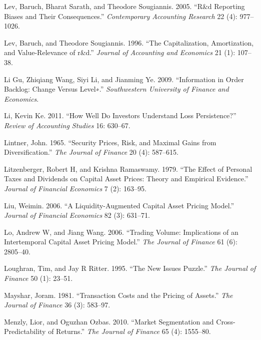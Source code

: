 \documentclass[
  letterpaper,
  DIV=11,
  numbers=noendperiod]{scrreprt}
\newlength{\cslhangindent}
\newlength{\cslentryspacingunit} %
\newenvironment{CSLReferences}[2] %
 {%
  \setlength{\parindent}{0pt}
  \ifodd #1
  \let\oldpar\par
  \def\par{\hangindent=\cslhangindent\oldpar}
  \fi
  \setlength{\parskip}{#2\cslentryspacingunit}
 }%
 {}
\begin{document}
\begin{CSLReferences}{1}{0}
\leavevmode{}%
Lev, Baruch, Bharat Sarath, and Theodore Sougiannis. 2005. {``R\&d
Reporting Biases and Their Consequences.''} \emph{Contemporary
Accounting Research} 22 (4): 977--1026.

\leavevmode{}%
Lev, Baruch, and Theodore Sougiannis. 1996. {``The Capitalization,
Amortization, and Value-Relevance of r\&d.''} \emph{Journal of
Accounting and Economics} 21 (1): 107--38.

\leavevmode{}%
Li Gu, Zhiqiang Wang, Siyi Li, and Jianming Ye. 2009. {``Information in
Order Backlog: Change Versus Level∗.''} \emph{Southwestern University of
Finance and Economics}.

\leavevmode{}%
Li, Kevin Ke. 2011. {``How Well Do Investors Understand Loss
Persistence?''} \emph{Review of Accounting Studies} 16: 630--67.

\leavevmode{}%
Lintner, John. 1965. {``Security Prices, Risk, and Maximal Gains from
Diversification.''} \emph{The Journal of Finance} 20 (4): 587--615.

\leavevmode{}%
Litzenberger, Robert H, and Krishna Ramaswamy. 1979. {``The Effect of
Personal Taxes and Dividends on Capital Asset Prices: Theory and
Empirical Evidence.''} \emph{Journal of Financial Economics} 7 (2):
163--95.

\leavevmode{}%
Liu, Weimin. 2006. {``A Liquidity-Augmented Capital Asset Pricing
Model.''} \emph{Journal of Financial Economics} 82 (3): 631--71.

\leavevmode{}%
Lo, Andrew W, and Jiang Wang. 2006. {``Trading Volume: Implications of
an Intertemporal Capital Asset Pricing Model.''} \emph{The Journal of
Finance} 61 (6): 2805--40.

\leavevmode{}%
Loughran, Tim, and Jay R Ritter. 1995. {``The New Issues Puzzle.''}
\emph{The Journal of Finance} 50 (1): 23--51.

\leavevmode{}%
Mayshar, Joram. 1981. {``Transaction Costs and the Pricing of Assets.''}
\emph{The Journal of Finance} 36 (3): 583--97.

\leavevmode{}%
Menzly, Lior, and Oguzhan Ozbas. 2010. {``Market Segmentation and
Cross-Predictability of Returns.''} \emph{The Journal of Finance} 65
(4): 1555--80.


\end{CSLReferences}
\end{document}
